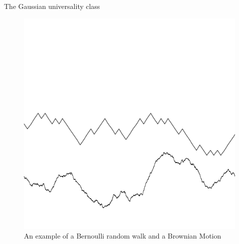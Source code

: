 \documentclass[9pt,t]{beamer}
\begin{document}
\begin{frame}{The Gaussian universality class}
\begin{figure}
\includegraphics[height=0.5\textheight]{graphics/Gaussian.png}
\caption{An example of a Bernoulli random walk and a Brownian Motion}
\end{figure}

\end{frame}
\end{document}
